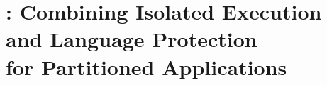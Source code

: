 \declarecommand{\sysname}{\civet{}}

\chapter{\sysname{}: Combining Isolated Execution and Language Protection\\ for Partitioned Applications}
\label{chap:civet}








